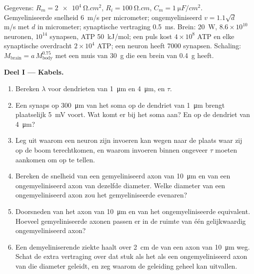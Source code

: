\begin{problem}
\label{pb:b3:nervous-systems:1}
Gegevens: $R_{m} = \qty{2e4}{\ohm.cm^2}$, $R_{i} = \qty{100}{\ohm.cm}$,
$C_{m} = \qty{1}{\micro F/cm^2}$. Gemyeliniseerde snelheid \qty{6}{m/s}
per micrometer; ongemyeliniseerd $v = 1.1\sqrt{d}$ m/s met $d$ in
micrometer; synaptische vertraging \qty{0.5}{ms}. Brein: \qty{20}{W},
$8.6\times 10^{10}$ neuronen, $10^{14}$ synapsen, ATP \qty{50}{kJ/mol};
een puls kost $4\times 10^{8}$ ATP en elke synaptische overdracht
$2\times 10^{4}$ ATP; een neuron heeft \num{7000} synapsen. Schaling:
$M_{\text{brain}} = a\,M_{\text{body}}^{0.75}$ met een muis van
\qty{30}{g} die een brein van \qty{0.4}{g} heeft.

\medskip
\noindent\textbf{Deel I --- Kabels.}
\begin{enumerate}
  \item Bereken $\lambda$ voor dendrieten van \qty{1}{\micro m} en
        \qty{4}{\micro m}, en $\tau$.
  \item Een synaps op \qty{300}{\micro m} van het soma op de dendriet
        van \qty{1}{\micro m} brengt plaatselijk \qty{5}{mV} voort. Wat
        komt er bij het soma aan? En op de dendriet van
        \qty{4}{\micro m}?
  \item Leg uit waarom een neuron zijn invoeren kan wegen naar de
        plaats waar zij op de boom terechtkomen, en waarom invoeren
        binnen ongeveer $\tau$ moeten aankomen om op te tellen.
  \item Bereken de snelheid van een gemyeliniseerd axon van
        \qty{10}{\micro m} en van een ongemyeliniseerd axon van
        dezelfde diameter. Welke diameter van een ongemyeliniseerd axon
        zou het gemyeliniseerde evenaren?
  \item Doorsneden van het axon van \qty{10}{\micro m} en van het
        ongemyeliniseerde equivalent. Hoeveel gemyeliniseerde axonen
        passen er in de ruimte van één gelijkwaardig ongemyeliniseerd
        axon?
  \item Een demyeliniserende ziekte haalt over \qty{2}{cm} de 
        van een axon van \qty{10}{\micro m} weg. Schat de extra
        vertraging over dat stuk als het als een ongemyeliniseerd axon
        van die diameter geleidt, en zeg waarom de geleiding geheel kan
        uitvallen.
\end{enumerate}


\end{problem}
